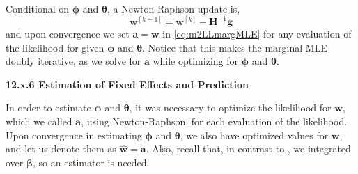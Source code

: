 \documentclass[12pt, titlepage]{article}
\begin{document}
Conditional on $\boldsymbol{\phi}$ and $\boldsymbol{\theta}$, a Newton-Raphson update is,
\[
\mathbf{w}^{[k+1]} = \mathbf{w}^{[k]} - \mathbf{H}^{-1}\mathbf{g}
\]
and upon convergence we set $\mathbf{a} = \mathbf{w}$ in \eqref{eq:m2LLmargMLE} for any evaluation of the likelihood for given $\boldsymbol{\phi}$ and $\boldsymbol{\theta}$.  Notice that this makes the marginal MLE doubly iterative, as we solve for $\mathbf{a}$ while optimizing for $\boldsymbol{\phi}$ and $\boldsymbol{\theta}$.





\vspace{.5cm}
{\large \flushleft \textbf{12.x.6 Estimation of Fixed Effects and Prediction}}
\vspace{.5cm}

In order to estimate $\boldsymbol{\phi}$ and $\boldsymbol{\theta}$, it was necessary to optimize the likelihood for $\mathbf{w}$, which we called $\mathbf{a}$, using Newton-Raphson, for each evaluation of the likelihood.  Upon convergence in estimating $\boldsymbol{\phi}$ and $\boldsymbol{\theta}$, we also have optimized values for $\mathbf{w}$, and let us denote them as $\hat{\mathbf{w}} = \mathbf{a}$.  Also, recall that, in contrast to \citet{bonat_practical_2016}, we integrated over $\boldsymbol{\beta}$, so an estimator is needed.
\end{document}
